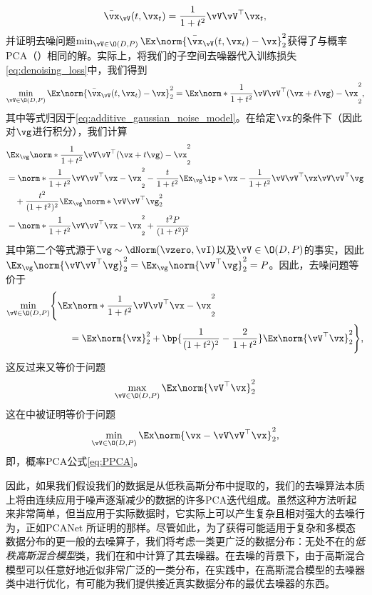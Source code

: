 \documentclass[../../book-main_zh.tex]{subfiles}
\begin{document}
\begin{equation}\label{eq:optimal nn}
    \bar{\vx}_{\vV}(t, \vx_{t}) = \frac{1}{1 + t^{2}}\vV\vV^{\top}\vx_{t},
\end{equation}
并证明去噪问题\(\min_{\vV \in \O(D, P)}\Ex\norm{\bar{\vx}_{\vV}(t, \vx_{t}) - \vx}_{2}^{2}\)获得了与概率PCA（）相同的解。实际上，将我们的子空间去噪器代入训练损失\eqref{eq:denoising_loss}中，我们得到
\begin{equation}
    \min_{\vV \in \O(D, P)}\Ex\norm{\bar{\vx}_{\vV}(t,
    \vx_{t}) - \vx}_{2}^{2} = \Ex\norm*{\frac{1}{1 +
    t^{2}}\vV\vV^{\top}(\vx + t\vg) - \vx}_{2}^{2},
\end{equation}
其中等式归因于\eqref{eq:additive_gaussian_noise_model}。在给定\(\vx\)的条件下（因此对\(\vg\)进行积分），我们计算
\begin{align}
    & \Ex_{\vg}\norm*{\frac{1}{1 + t^{2}}\vV\vV^{\top}(\vx + t\vg) -
    \vx}_{2}^{2} \\
    &= \norm*{\frac{1}{1 + t^{2}}\vV\vV^{\top}\vx - \vx}_{2}^{2} -
    \frac{t}{1+t^2}\Ex_{\vg} \ip*{\vx - \frac{1}{1 +
    t^{2}}\vV\vV^{\top}\vx}{\vV\vV^{\top}\vg} \\
    &\quad + \frac{t^2}{(1+t^2)^2} \Ex_{\vg}\norm*{\vV\vV^{\top} \vg}_{2}^{2} \\
    &= \norm*{\frac{1}{1 + t^{2}}\vV\vV^{\top}\vx - \vx}_{2}^{2} +
    \frac{t^2P}{(1+t^2)^2}
\end{align}
其中第二个等式源于\(\vg \sim \dNorm(\vzero, \vI)\)以及\(\vV \in \O(D, P)\)的事实，因此\(\Ex_{\vg}\norm{\vV\vV^\top \vg}_{2}^{2} = \Ex_{\vg}\norm{\vV^\top \vg}_{2}^{2} = P\)。因此，去噪问题等价于
\begin{align}
    \min_{\vV \in \O(D, P)} & \Bigg\{\Ex \norm*{\frac{1}{1 +
        t^{2}}\vV\vV^{\top}\vx - \vx}_{2}^{2} \\
        & \qquad = \Ex\norm{\vx}_{2}^{2} + \bp{\frac{1}{(1 +
            t^{2})^{2}} - \frac{2}{1 +
    t^{2}}}\Ex\norm{\vV^{\top}\vx}_{2}^{2}\Bigg\},
\end{align}
这反过来又等价于问题
\begin{equation}\label{eq:PCA}
    \max_{\vV \in \O(D, P)}\Ex\norm{\vV^{\top}\vx}_{2}^{2}
\end{equation}
这在中被证明等价于问题
\begin{equation}
    \min_{\vV \in \O(D, P)}\Ex\norm{\vx - \vV\vV^{\top}\vx}_{2}^{2},
\end{equation}
即，概率PCA公式\eqref{eq:PPCA}。

因此，如果我们假设我们的数据是从低秩高斯分布中提取的，我们的去噪算法本质上将由连续应用于噪声逐渐减少的数据的许多PCA迭代组成。虽然这种方法听起来非常简单，但当应用于实际数据时，它实际上可以产生复杂且相对强大的去噪行为，正如PCANet \parencite{chan2015pcanet}所证明的那样。尽管如此，为了获得可能适用于复杂和多模态数据分布的更一般的去噪算子，我们将考虑一类更广泛的数据分布：无处不在的\textit{低秩高斯混合模型}类，我们在和中计算了其去噪器。在去噪的背景下，由于高斯混合模型可以任意好地近似非常广泛的一类分布，在实践中，在高斯混合模型的去噪器类中进行优化，有可能为我们提供接近真实数据分布的最优去噪器的东西。
\end{document}
